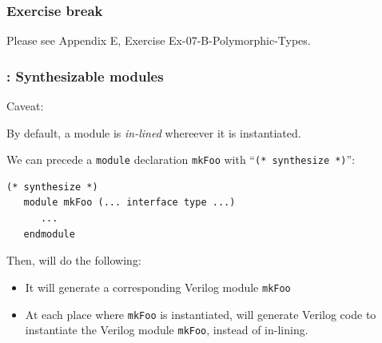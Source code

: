 
\begin{frame}
\frametitle{\EmojiExercise \hmm Exercise break}

Please see Appendix E, Exercise Ex-07-B-Polymorphic-Types.

\end{frame}


\begin{frame}[fragile]
\frametitle{{\BSV}: Synthesizable modules}

\footnotesize

Caveat:

\vspace{5ex}

By default, a {\BSV} module is \emph{in-lined} whereever it is instantiated.

\vspace{1ex}

We can precede a {\tt module} declaration {\tt mkFoo} with ``{\tt (*
synthesize *)}'':

\begin{Verbatim}[frame=single]
   (* synthesize *)
   module mkFoo (... interface type ...)
      ...
   endmodule
\end{Verbatim}

Then, {\bsc} will do the following:
\begin{itemize}
 \item It will generate a corresponding  Verilog module {\tt mkFoo}

 \item At each place where {\tt mkFoo} is instantiated, {\bsc} will
       generate Verilog code to instantiate the Verilog module {\tt mkFoo},
       instead of in-lining.
\end{itemize}

\end{frame}

